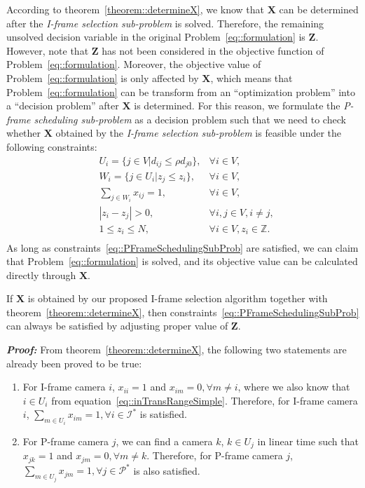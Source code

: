 According to theorem~\ref{theorem::determineX}, we know that $\mathbf{X}$ can be determined after the \emph{I-frame selection sub-problem} is solved.
Therefore, the remaining unsolved decision variable in the original Problem~\eqref{eq::formulation} is $\mathbf{Z}$.
However, note that $\mathbf{Z}$ has not been considered in the objective function of Problem~\eqref{eq::formulation}.
Moreover, the objective value of Problem~\eqref{eq::formulation} is only affected by $\mathbf{X}$, which means that Problem~\eqref{eq::formulation} can be transform from an ``optimization problem'' into a ``decision problem'' after $\mathbf{X}$ is determined.
For this reason, we formulate the \emph{P-frame scheduling sub-problem} as a decision problem such that we need to check whether $\mathbf{X}$ obtained by the \emph{I-frame selection sub-problem} is feasible under the following constraints:
\begin{align}
	&U_i = \{ j \in V | d_{ij} \leq \rho d_{j0} \}, &\forall i \in V, \nonumber \\
	&W_i = \{ j \in U_i | z_j \leq z_i \}, &\forall i \in V, \nonumber \\
	&\sum_{j \in W_i} x_{ij} = 1, &\forall i \in V, \nonumber \\
	&|z_i - z_j| > 0, &\forall i,j \in V, i \neq j, \nonumber \\
	&1 \leq z_i \leq N, &\forall i \in V, z_i \in \mathbb{Z}. \nonumber \\
\label{eq::PFrameSchedulingSubProb}
\end{align}
As long as constraints~\eqref{eq::PFrameSchedulingSubProb} are satisfied, we can claim that Problem~\eqref{eq::formulation} is solved, and its objective value can be calculated directly through $\mathbf{X}$.
%
\begin{mythm}
If $\mathbf{X}$ is obtained by our proposed I-frame selection algorithm together with theorem~\ref{theorem::determineX}, then constraints~\eqref{eq::PFrameSchedulingSubProb} can always be satisfied by adjusting proper value of $\mathbf{Z}$.
\label{theorem::IFrameSolalwaysFeasible}
\end{mythm}
\textbf{\emph{Proof:}}
From theorem~\ref{theorem::determineX}, the following two statements are already been proved to be true:
\begin{enumerate}
\item For I-frame camera $i$, $x_{ii}=1$ and ${x_{im} = 0}, {\forall m \neq i}$, where we also know that $i \in U_i$ from equation~\eqref{eq::inTransRangeSimple}.
Therefore, for I-frame camera $i$, ${\underset{m \in U_i}{\sum} x_{im}=1},{\forall i \in \mathcal{I}^*}$ is satisfied.
\item For P-frame camera $j$, we can find a camera $k$, ${k \in U_j}$ in linear time such that ${x_{jk} = 1}$ and ${x_{jm}=0}, \forall m \neq k$.
Therefore, for P-frame camera $j$, ${\underset{m \in U_j}{\sum} x_{jm}=1},{\forall j \in \mathcal{P}^*}$ is also satisfied.
\end{enumerate}

